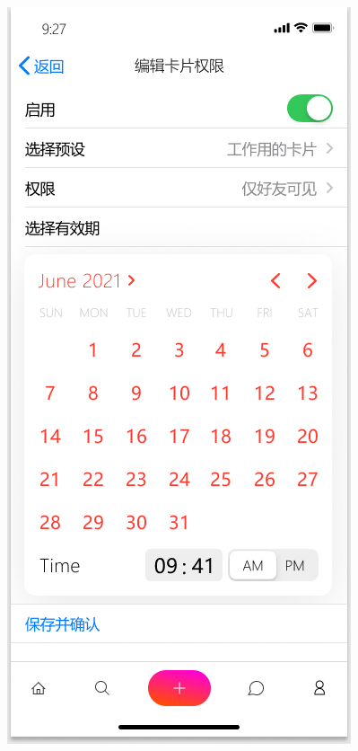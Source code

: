 \documentclass[UTF8]{ctexart}
\begin{document}
\begin{figure}[htbp]
{\begin{minipage}[b]{.3\linewidth}
            \centering
            \includegraphics[scale=0.3]{NFCCardManage.png}
        \end{minipage}
    }
\end{figure}
\end{document}
